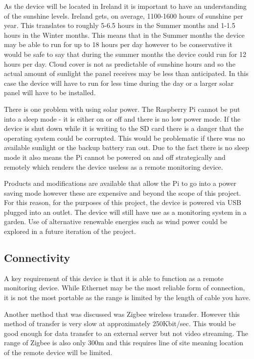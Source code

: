 \documentclass[10pt,a4paper]{article}
\begin{document}
As the device will be located in Ireland it is important to have an understanding of the sunshine levels. Ireland gets, on average, 1100-1600 hours of sunshine per year\cite{website:metsunshine}. This translates to roughly 5-6.5 hours in the Summer months and 1-1.5 hours in the Winter months. This means that in the Summer months the device may be able to run for up to 18 hours per day however to be conservative it would be safe to say that during the summer months the device could run for 12 hours per day. Cloud cover is not as predictable of sunshine hours and so the actual amount of sunlight the panel receives may be less than anticipated. In this case the device will have to run for less time during the day or a larger solar panel will have to be installed. 

There is one problem with using solar power. The Raspberry Pi cannot be put into a sleep mode - it is either on or off and there is no low power mode. If the device is shut down while it is writing to the SD card there is a danger that the operating system could be corrupted. This would be problematic if there was no available sunlight or the backup battery ran out. Due to the fact there is no sleep mode it also means the Pi cannot be powered on and off strategically and remotely which renders the device useless as a remote monitoring device. 

Products and modifications are available that allow the Pi to go into a power saving mode however these are expensive and beyond the scope of this project. For this reason, for the purposes of this project, the device is powered via USB plugged into an outlet. The device will still have use as a monitoring system in a garden. Use of alternative renewable energies such as wind power could be explored in a future iteration of the project.

\subsection{Connectivity}
A key requirement of this device is that it is able to function as a remote monitoring device. While Ethernet may be the most reliable form of connection, it is not the most portable as the range is limited by the length of cable you have. 

Another method that was discussed was Zigbee wireless transfer. However this method of transfer is very slow at approximately 250Kbit/sec. This would be good enough for data transfer to an external server but not video streaming. The range of Zigbee is also only 300m and this requires line of site meaning location of the remote device will be limited. 
\end{document}
